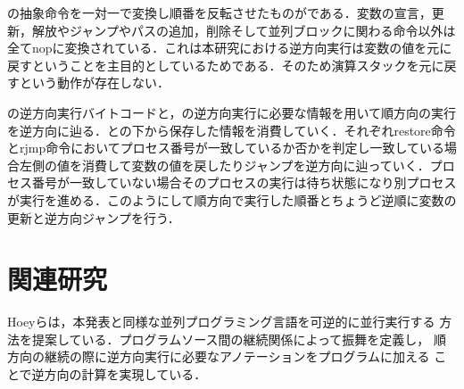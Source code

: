 \documentclass[submit,PRO]{ipsj}
\begin{document}
の抽象命令を一対一で変換し順番を反転させたものがである．変数の宣言，更新，解放やジャンプやパスの追加，削除そして並列ブロックに関わる命令以外は全てnopに変換されている．これは本研究における逆方向実行は変数の値を元に戻すということを主目的としているためである．そのため演算スタックを元に戻すという動作が存在しない．

の逆方向実行バイトコードと，の逆方向実行に必要な情報を用いて順方向の実行を逆方向に辿る．との下から保存した情報を消費していく．それぞれrestore命令とrjmp命令においてプロセス番号が一致しているか否かを判定し一致している場合左側の値を消費して変数の値を戻したりジャンプを逆方向に辿っていく．プロセス番号が一致していない場合そのプロセスの実行は待ち状態になり別プロセスが実行を進める．このようにして順方向で実行した順番とちょうど逆順に変数の更新と逆方向ジャンプを行う．


\section{関連研究}

Hoeyらは，本発表と同様な並列プログラミング言語を可逆的に並行実行する
方法を提案している．プログラムソース間の継続関係によって振舞を定義し，
順方向の継続の際に逆方向実行に必要なアノテーションをプログラムに加える
ことで逆方向の計算を実現している．

\end{document}
